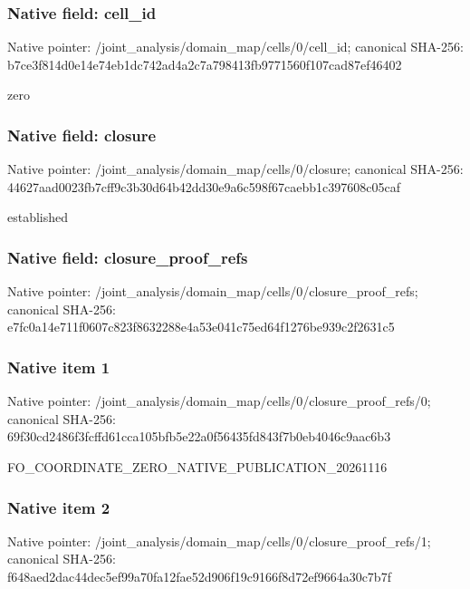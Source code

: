 \documentclass[10pt,a4paper]{article}
\begin{document}
\subsubsection{Native field: cell\_\allowbreak{}id}
Native pointer: /joint\_\allowbreak{}analysis/domain\_\allowbreak{}map/cells/0/cell\_\allowbreak{}id; canonical SHA-256: b7ce3f814d0e14e74eb1dc742ad4a2c7a798413fb9771560f107cad87ef46402

\begingroup\raggedright\sloppy zero\par\endgroup

\subsubsection{Native field: closure}
Native pointer: /joint\_\allowbreak{}analysis/domain\_\allowbreak{}map/cells/0/closure; canonical SHA-256: 44627aad0023fb7cff9c3b30d64b42dd30e9a6c598f67caebb1c397608c05caf

\begingroup\raggedright\sloppy established\par\endgroup

\subsubsection{Native field: closure\_\allowbreak{}proof\_\allowbreak{}refs}
Native pointer: /joint\_\allowbreak{}analysis/domain\_\allowbreak{}map/cells/0/closure\_\allowbreak{}proof\_\allowbreak{}refs; canonical SHA-256: e7fc0a14e711f0607c823f8632288e4a53e041c75ed64f1276be939c2f2631c5

\subsubsection{Native item 1}
Native pointer: /joint\_\allowbreak{}analysis/domain\_\allowbreak{}map/cells/0/closure\_\allowbreak{}proof\_\allowbreak{}refs/0; canonical SHA-256: 69f30cd2486f3fcffd61cca105bfb5e22a0f56435fd843f7b0eb4046c9aac6b3

\begingroup\raggedright\sloppy FO\_\allowbreak{}COORDINATE\_\allowbreak{}ZERO\_\allowbreak{}NATIVE\_\allowbreak{}PUBLICATION\_\allowbreak{}20261116\par\endgroup

\subsubsection{Native item 2}
Native pointer: /joint\_\allowbreak{}analysis/domain\_\allowbreak{}map/cells/0/closure\_\allowbreak{}proof\_\allowbreak{}refs/1; canonical SHA-256: f648aed2dac44dec5ef99a70fa12fae52d906f19c9166f8d72ef9664a30c7b7f
\end{document}
